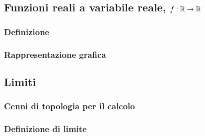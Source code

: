 \documentclass[letterpaper,10pt,english]{jupyterBook}
\begin{document}
\subsection{Funzioni reali a variabile reale, \protect\(f: \mathbb{R} \rightarrow \mathbb{R}\protect\)}
\label{\detokenize{ch/infinitesimal_calculus/analysis:funzioni-reali-a-variabile-reale-f-mathbb-r-rightarrow-mathbb-r}}\label{\detokenize{ch/infinitesimal_calculus/analysis:infinitesimal-calculus-analysis-real-functions}}

\subsubsection{Definizione}
\label{\detokenize{ch/infinitesimal_calculus/analysis:definizione}}\label{\detokenize{ch/infinitesimal_calculus/analysis:infinitesimal-calculus-analysis-real-functions-def}}

\subsubsection{Rappresentazione grafica}
\label{\detokenize{ch/infinitesimal_calculus/analysis:rappresentazione-grafica}}\label{\detokenize{ch/infinitesimal_calculus/analysis:infinitesimal-calculus-analysis-real-functions-graph}}



\subsection{Limiti}
\label{\detokenize{ch/infinitesimal_calculus/analysis:limiti}}\label{\detokenize{ch/infinitesimal_calculus/analysis:infinitesimal-calculus-limits}}

\subsubsection{Cenni di topologia per il calcolo}
\label{\detokenize{ch/infinitesimal_calculus/analysis:cenni-di-topologia-per-il-calcolo}}
\sphinxAtStartPar
{} 


\subsubsection{Definizione di limite}
\label{\detokenize{ch/infinitesimal_calculus/analysis:definizione-di-limite}}\label{\detokenize{ch/infinitesimal_calculus/analysis:infinitesimal-calculus-limits-def}}
\end{document}

